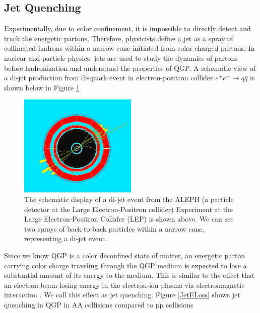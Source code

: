 \subsection{Jet Quenching} 

Experimentally, due to color confinement, it is impossible to directly detect and track the energetic partons. Therefore, physicists define a jet as a spray of collimated hadrons within a narrow cone initiated from color charged partons. In nuclear and particle physics, jets are used to study the dynamics of partons before hadronization \cite{HERAJET} and understand the properties of QGP. A schematic view of a di-jet production from di-quark event in electron-positron collider $e^+e^-\rightarrow q \bar q$ is shown below in Figure \ref{dijet}


\begin{figure}[hbtp]
\begin{center}
\includegraphics[width=0.50\textwidth]{Figures/Chapter1/DijetEvt.png}
\caption{The schematic display of a di-jet event from the ALEPH (a particle detector at the Large Electron-Positron collider) Experiment at the Large Electron-Positron Collider (LEP) is shown above. We can see two sprays of back-to-back particles within a narrow cone, representing a di-jet event.}
\label{dijet}
\end{center}
\end{figure} 


Since we know QGP is a color deconfined state of matter, an energetic parton carrying color charge traveling through the QGP medium is expected to lose a substantial amount of its energy to the medium. This is similar to the effect that an electron beam losing energy in the electron-ion plasma via electromagnetic interaction \cite{ELossPlasma}. We call this effect as jet quenching. Figure \ref{JetELoss} shows jet quenching in QGP in AA collisions compared to pp collisions

